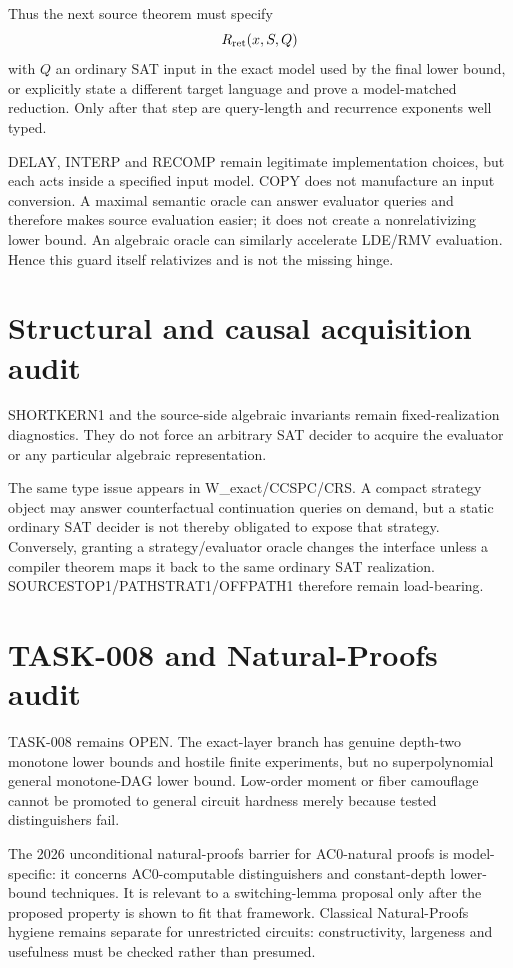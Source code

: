 \documentclass[11pt]{article}
\begin{document}
Thus the next source theorem must specify
\[
R_{\rm ret}(x,S,Q)
\]
with $Q$ an ordinary SAT input in the exact model used by the final lower bound, or explicitly state a different target language and prove a model-matched reduction. Only after that step are query-length and recurrence exponents well typed.

DELAY, INTERP and RECOMP remain legitimate implementation choices, but each acts inside a specified input model. COPY does not manufacture an input conversion. A maximal semantic oracle can answer evaluator queries and therefore makes source evaluation easier; it does not create a nonrelativizing lower bound. An algebraic oracle can similarly accelerate LDE/RMV evaluation. Hence this guard itself relativizes and is not the missing hinge.

\section*{Structural and causal acquisition audit}
SHORTKERN1 and the source-side algebraic invariants remain fixed-realization diagnostics. They do not force an arbitrary SAT decider to acquire the evaluator or any particular algebraic representation.

The same type issue appears in W_exact/CCSPC/CRS. A compact strategy object may answer counterfactual continuation queries on demand, but a static ordinary SAT decider is not thereby obligated to expose that strategy. Conversely, granting a strategy/evaluator oracle changes the interface unless a compiler theorem maps it back to the same ordinary SAT realization. SOURCESTOP1/PATHSTRAT1/OFFPATH1 therefore remain load-bearing.

\section*{TASK-008 and Natural-Proofs audit}
TASK-008 remains OPEN. The exact-layer branch has genuine depth-two monotone lower bounds and hostile finite experiments, but no superpolynomial general monotone-DAG lower bound. Low-order moment or fiber camouflage cannot be promoted to general circuit hardness merely because tested distinguishers fail.

The 2026 unconditional natural-proofs barrier for AC0-natural proofs is model-specific: it concerns AC0-computable distinguishers and constant-depth lower-bound techniques. It is relevant to a switching-lemma proposal only after the proposed property is shown to fit that framework. Classical Natural-Proofs hygiene remains separate for unrestricted circuits: constructivity, largeness and usefulness must be checked rather than presumed.
\end{document}
